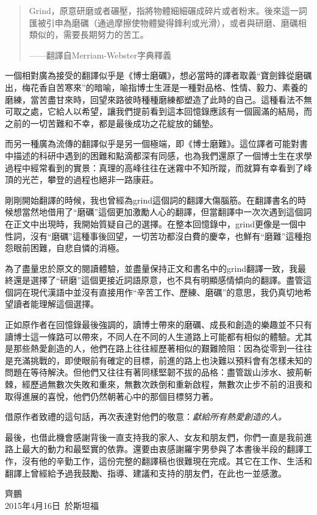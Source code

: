 \documentclass[12pt,UTF8,nofonts]{book}
\begin{document}
\begin{quote}
Grind，原意研磨或者碾壓，指將物體細細碾成碎片或者粉末。後來這一詞匯被引申為磨礪（通過摩擦使物體變得鋒利或光滑），或者與研磨、磨礪相類似的，需要長期努力的苦工。

——翻譯自Merriam-Webster字典釋義
\end{quote}

一個相對廣為接受的翻譯似乎是《博士磨礪》，想必當時的譯者取義“寶劍鋒從磨礪出，梅花香自苦寒來”的暗喻，喻指博士生涯是一種對品格、性情、毅力、素養的磨練，當苦盡甘來時，回望來路彼時種種磨練都塑造了此時的自己。這種看法不無可取之處，它給人以希望，讓我們提前看到這本回憶錄應該有一個圓滿的結局，而之前的一切苦難和不幸，都是最後成功之花綻放的鋪墊。

而另一種廣為流傳的翻譯似乎是另一個極端，即《博士磨難》。這位譯者可能對書中描述的科研中遇到的困難和點滴都深有同感，也為我們還原了一個博士生在求學過程中經常看到的實景：真理的高峰往往在迷霧中不知所蹤，而就算有幸看到了峰頂的光芒，攀登的過程也絕非一路康莊。

剛剛開始翻譯的時候，我也曾經為grind這個詞的翻譯大傷腦筋。在翻譯書名的時候想當然地借用了“磨礪”這個更加激勵人心的翻譯，但當翻譯中一次次遇到這個詞在正文中出現時，我開始質疑自己的選擇。在整本回憶錄中，grind更像是一個中性詞，沒有“磨礪”這種事後回望，一切苦功都沒白費的慶幸，也鮮有“磨難”這種抱怨眼前困難，自悲自憐的消極。

為了盡量忠於原文的閱讀體驗，並盡量保持正文和書名中的grind翻譯一致，我最終還是選擇了“研磨”這個更接近詞語原意，也不具有明顯感情傾向的翻譯。盡管這個詞在現代漢語中並沒有直接用作“辛苦工作、歷練、磨礪”的意思，我仍真切地希望讀者能理解這個選擇。


正如原作者在回憶錄最後強調的，讀博士帶來的磨礪、成長和創造的樂趣並不只有讀博士這一條路可以帶來，不同人在不同的人生道路上可能都有相似的體驗。尤其是那些熱愛創造的人，他們在路上往往經歷著相似的艱難險阻：因為從零到一往往是充滿挑戰的，即使眼前有確定的目標，前進的路上也決難以預料會有怎樣未知的問題在等待解決。但他們又往往有著同樣堅韌不拔的品格：盡管跋山涉水、披荊斬棘，經歷過無數次失敗和重來，無數次跌倒和重新啟程，無數次止步不前的沮喪和取得進展的喜悅，他們仍然朝著心中的那個目標努力著。

借原作者致禮的這句話，再次表達對他們的敬意：\emph{獻給所有熱愛創造的人。}

最後，也借此機會感謝背後一直支持我的家人、女友和朋友們，你們一直是我前進路上最大的動力和最堅實的依靠。還要由衷感謝羅宇男參與了本書後半段的翻譯工作，沒有他的辛勤工作，這份完整的翻譯稿也很難現在完成。其它在工作、生活和翻譯上曾經給予過我鼓勵、指導、建議和支持的朋友們，在此也一並感激。
\\[3em]
\begin{flushright}
齊鵬\\
2015年4月16日\ 於斯坦福
\end{flushright}
\end{document}
